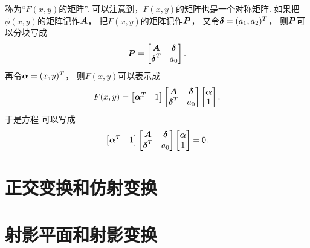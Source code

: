 称为“\(F(x,y)\)的矩阵”.
可以注意到，\(F(x,y)\)的矩阵也是一个对称矩阵.
如果把\(\phi(x,y)\)的矩阵记作\(\boldsymbol{A}\)，
把\(F(x,y)\)的矩阵记作\(\boldsymbol{P}\)，
又令\(\boldsymbol\delta = (a_1,a_2)^T\)，
则\(\boldsymbol{P}\)可以分块写成\begin{equation*}
	\boldsymbol{P}
	= \begin{bmatrix}
		\boldsymbol{A} & \boldsymbol\delta \\
		\boldsymbol\delta^T & a_0
	\end{bmatrix}.
\end{equation*}
再令\(\boldsymbol\alpha = (x,y)^T\)，
则\(F(x,y)\)可以表示成\begin{equation*}
	F(x,y)
	= \begin{bmatrix}
		\boldsymbol\alpha^T & 1
	\end{bmatrix}
	\begin{bmatrix}
		\boldsymbol{A} & \boldsymbol\delta \\
		\boldsymbol\delta^T & a_0
	\end{bmatrix}
	\begin{bmatrix}
		\boldsymbol\alpha \\ 1
	\end{bmatrix}.
\end{equation*}
于是方程  可以写成
\begin{equation}\label{equation:二次曲线方程.平面二次曲线的一般方程.矩阵形式}
	\begin{bmatrix}
		\boldsymbol\alpha^T & 1
	\end{bmatrix}
	\begin{bmatrix}
		\boldsymbol{A} & \boldsymbol\delta \\
		\boldsymbol\delta^T & a_0
	\end{bmatrix}
	\begin{bmatrix}
		\boldsymbol\alpha \\ 1
	\end{bmatrix}
	= 0.
\end{equation}
\endgroup







\chapter{正交变换和仿射变换}

\chapter{射影平面和射影变换}

% 
